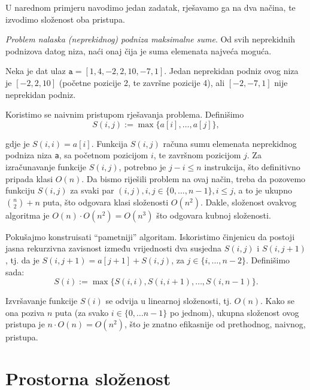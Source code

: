 U narednom primjeru navodimo jedan zadatak, rješavamo ga na dva načina, te izvodimo složenost oba pristupa.

\begin{example}
 \textit{{Problem nalaska (neprekidnog) podniza  maksimalne sume}}.  Od svih neprekidnih podnizova datog
 niza, naći onaj čija je suma elemenata najveća moguća. 
\end{example}
\begin{solution}
 
 Neka je dat ulaz $\texttt{a} = [1, 4, -2, 2, 10, -7, 1]$.  Jedan neprekidan podniz ovog niza je $[ -2, 2, 10 ]$ (početne pozicije 2, te završne pozicije 4), ali $[-2, -7, 1]$ nije neprekidan podniz. 
 
Koristimo se naivnim pristupom rješavanja problema. Definišimo $$S(i, j) := \max  \{ a[i], \ldots, a[j] \},$$

gdje je $S(i, i ) = a[i]$. 
Funkcija $S(i,j)$ računa sumu elemenata neprekidnog podniza niza \texttt{a}, sa početnom pozicijom  $i$, te završnom pozicijom $j$.
Za izračunavanje funkcije $S(i, j)$, potrebno je $j-i \leq n$ instrukcija, što definitivno pripada klasi $O(n)$. Da bismo riješili problem na ovaj način, 
treba da pozovemo funkciju $S(i,j)$ za svaki par $(i,j),  {i, j \in \{0, \ldots , n-1\},  i \leq j}$, a to je ukupno $\binom{n}{2} + n$ puta, što odgovara klasi složenosti $O(n^2)$. Dakle, složenost ovakvog algoritma je $O(n)\cdot O(n^2) = O(n^3)$ što odgovara kubnoj složenosti. 

Pokušajmo konstruisati ``pametniji'' algoritam. Iskoristimo činjenicu da postoji jasna rekurzivna zavisnost između vrijednosti dva susjedna $S(i,j)$ i $S(i, j+1)$, tj. da je $S(i, j+1) = a[j+1] + S(i, j)$, za $j \in \{i, \ldots, n-2\}$. Definišimo sada:
$$ S(i):= \max \{ S(i, i), S(i, i+1), \ldots, S(i, n-1)\}.$$

Izvršavanje funkcije $S(i)$ se odvija u linearnoj složenosti, tj. $O(n)$. Kako se ona poziva $n$ puta (za svako $i \in \{0, \ldots n-1\}$ po jednom), ukupna složenost ovog pristupa je $n \cdot O(n) = O(n^2)$, što je znatno efikasnije od prethodnog, naivnog, pristupa. 
 

\end{solution}

 
 \section{Prostorna složenost}
 
 
